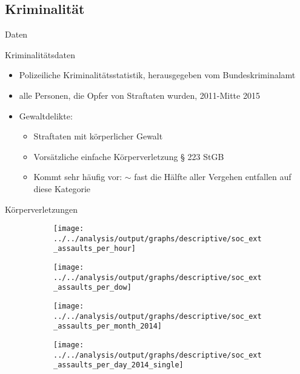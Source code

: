 \documentclass[usenames,dvipsnames,ngerman]{beamer} %
\begin{document}
	\subsection{Kriminalität}
	\begin{frame}{Daten}\label{CRIME_DATA}
		\begin{block}{Kriminalitätsdaten}
			\begin{itemize}
				\item Polizeiliche Kriminalitätsstatistik, herausgegeben vom Bundeskriminalamt
				\item alle Personen, die Opfer von Straftaten wurden, 2011-Mitte 2015
				\item Gewaltdelikte: 
				\begin{itemize}
					\item Straftaten mit körperlicher Gewalt
					\item Vorsätzliche einfache
					Körperverletzung § 223 StGB
					\item Kommt sehr häufig vor: $\sim$ fast die Hälfte aller Vergehen entfallen auf diese Kategorie\newline \hyperlink{CRIMINAL_OFFENSE_CODES}{}
				\end{itemize}
			\end{itemize}
		\end{block}	
	\end{frame}




	\begin{frame}{Körperverletzungen}
		\begin{figure}
			\begin{subfigure}[h]{0.48\linewidth}\centering
				\texttt{[image: ../../analysis/output/graphs/descriptive/soc\_ext\_assaults\_per\_hour]}
			\end{subfigure}
			\begin{subfigure}[h]{0.48\linewidth}\centering
				\texttt{[image: ../../analysis/output/graphs/descriptive/soc\_ext\_assaults\_per\_dow]}
			\end{subfigure}
			\begin{subfigure}[h]{0.48\linewidth}\centering
				\texttt{[image: ../../analysis/output/graphs/descriptive/soc\_ext\_assaults\_per\_month\_2014]}
			\end{subfigure}
			\begin{subfigure}[h]{0.48\linewidth}\centering
				\texttt{[image: ../../analysis/output/graphs/descriptive/soc\_ext\_assaults\_per\_day\_2014\_single]}
			\end{subfigure}
		\end{figure}
	\end{frame}
\end{document}
